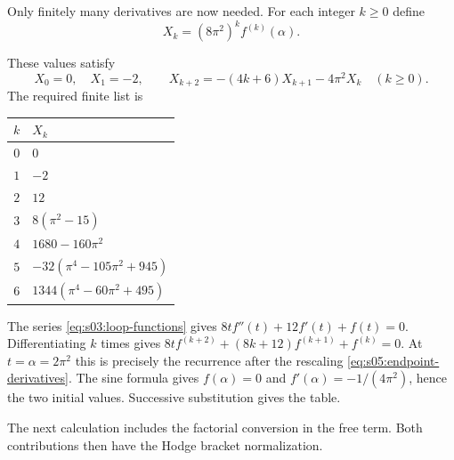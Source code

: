 Only finitely many derivatives are now needed. For each integer
$k\geq0$ define
\begin{equation}\label{eq:s05:endpoint-derivatives}
 X_k=(8\pi^2)^k f^{(k)}(\alpha).
\end{equation}

\begin{lmm}\label{lmm:s05:endpoint-derivatives}
These values satisfy
\begin{equation}\label{eq:s05:derivative-recurrence}
 X_0=0,\quad X_1=-2,\qquad
 X_{k+2}=-(4k+6)X_{k+1}-4\pi^2X_k\quad(k\geq0).
\end{equation}
The required finite list is
\begin{center}
\begin{tabular}{c|l}
$k$ & $X_k$ \\\hline
$0$ & $0$ \\
$1$ & $-2$ \\
$2$ & $12$ \\
$3$ & $8(\pi^2-15)$ \\
$4$ & $1680-160\pi^2$ \\
$5$ & $-32(\pi^4-105\pi^2+945)$ \\
$6$ & $1344(\pi^4-60\pi^2+495)$
\end{tabular}
\end{center}
\end{lmm}
\begin{prf}
The series \eqref{eq:s03:loop-functions} gives
$8tf''(t)+12f'(t)+f(t)=0$. Differentiating $k$ times gives
$8tf^{(k+2)}+(8k+12)f^{(k+1)}+f^{(k)}=0$.
At $t=\alpha=2\pi^2$ this is precisely the recurrence after the
rescaling \eqref{eq:s05:endpoint-derivatives}.
The sine formula gives $f(\alpha)=0$ and
$f'(\alpha)=-1/(4\pi^2)$, hence the two initial values.
Successive substitution gives the table.
\end{prf}

The next calculation includes the factorial conversion in the free
term. Both contributions then have the Hodge bracket normalization.

